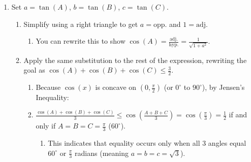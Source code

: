 \documentclass[12pt]{article}
\begin{document}
\begin{enumerate}
\begin{enumerate}
\begin{enumerate}
\begin{itemize}
\[                \]
                \item \textbf{Bound the Sum to Isolate $k$:} Since $A, B, C \in \left(0, \frac{\pi}{2}\right)$, summing these strict inequalities gives:
                \[
                    0 < A + B + C < \frac{3\pi}{2}
                \]
                Substituting $A + B + C = k\pi$ into the inequality:
                \[
                    0 < k\pi < \frac{3\pi}{2}
                \]
                Dividing through by $\pi$ gives:
                \[
                    0 < k < 1.5
                \]
                \item \textbf{Conclude:} Because $k$ must be an integer ($k \in \mathbb{Z}$), the unique solution is $k = 1$. Thus:
                \[
                    A + B + C = \pi \quad (\text{or } 180^\circ)
                \]
            \end{itemize}
        \end{enumerate}
    \end{enumerate}

    \item Set $a = \tan(A)$, $b = \tan(B)$, $c = \tan(C)$.
    \begin{enumerate}
        \item Simplify using a right triangle to get $a = \text{opp.}$ and $1 = \text{adj.}$
        \begin{enumerate}
            \item You can rewrite this to show $\cos(A) = \frac{\text{adj.}}{\text{hyp.}} = \frac{1}{\sqrt{1 + a^2}}$.
        \end{enumerate}
        \item Apply the same substitution to the rest of the expression, rewriting the goal as $\cos(A) + \cos(B) + \cos(C) \le \frac{3}{2}$.
        \begin{enumerate}
            \item Because $\cos(x)$ is concave on $\left(0, \frac{\pi}{2}\right)$ (or $0^\circ$ to $90^\circ$), by Jensen's Inequality:
            \item $\frac{\cos(A) + \cos(B) + \cos(C)}{3} \le \cos\left(\frac{A + B + C}{3}\right) = \cos\left(\frac{\pi}{3}\right) = \frac{1}{2}$ if and only if $A = B = C = \frac{\pi}{3}$ ($60^\circ$).
            \begin{enumerate}
                \item This indicates that equality occurs only when all $3$ angles equal $60^\circ$ or $\frac{\pi}{3}$ radians (meaning $a = b = c = \sqrt{3}$).
            \end{enumerate}
        \end{enumerate}
    \end{enumerate}


\end{enumerate}
\end{document}
